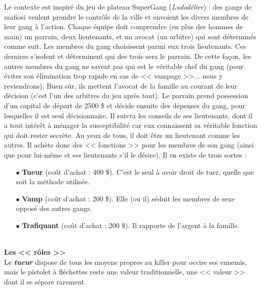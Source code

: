 \documentclass[11pt,twoside,a4paper]{article}
\begin{document}
\begin{multicols*}{2}
	\small
	
Le contexte est inspir{\'e} du jeu de plateau SuperGang (\emph{Ludod{\'e}lire}) : des gangs de mafiosi veulent prendre  le contr{\^o}le de la ville et envoient les divers membres  de leur gang {\`a} l'action. Chaque {\'e}quipe doit comprendre (en plus des hommes de main) un parrain, deux lieutenants, et un avocat (un arbitre) qui sont d{\'e}termin{\'e}s comme suit. Les membres du gang choisissent parmi eux trois lieutenants. Ces derniers s'isolent et d{\'e}terminent qui des trois sera le parrain. De cette fa\c{c}on, les autres membres du gang ne savent pas qui est le v{\'e}ritable chef du gang (pour {\'e}viter son {\'e}limination trop rapide en cas de << vampage >>... nous y reviendrons). Buen s{\^u}r, ils mettent l'avocat de la famille au courant de leur d{\'e}cision (c'est l'un des arbitres du jeu apr{\`e}s tout). Le parrain prend possession d'un capital de d{\'e}part de 2500 \$ et d{\'e}cide ensuite des d{\'e}penses du gang, pour lesquelles il est seul d{\'e}cisionnaire. Il suivra les conseils de ses lieutenants, dont il a tout int{\'e}r{\^e}t {\`a} m{\'e}nager la susceptibilit{\'e} car eux connaissent sa v{\'e}ritable fonction qui doit rester secr{\`e}te. Au yeux de tous, il doit {\^e}tre un lieutenant comme les autres. Il ach{\`e}te donc des << fonctions >> pour les membres de son gang (ainsi que pour lui-m{\^e}me et ses lieutenants s'il le d{\'e}sire). Il en existe de trois sortes : 
\begin{itemize}
	\item[$\bullet$] \textbf{Tueur} (co{\^u}t d'achat : 400 \$). C'est le seul {\`a} avoir droit de tuer, quelle que soit la m{\'e}thode utilis{\'e}e. 
	\item[$\bullet$] \textbf{Vamp} (co{\^u}t d'achat : 200 \$). Elle (ou il) s{\'e}duit les membres de sexe oppos{\'e} des autres gangs. 
	\item[$\bullet$] \textbf{Trafiquant} (co{\^u}t d'achat : 200 \$). Il rapporte de l'argent {\`a} la famille. 
\end{itemize}~\\

\textbf{\large Les << r{\^o}les >>}~\\

Le \textbf{\emph{tueur}} dispose de tous les moyens propres au killer pour occire ses ennemis, mais le pistolet {\`a} fl{\'e}chettes reste une valeur traditionnelle, une << valeur >> dont il se s{\'e}pare rarement. ~\\


\end{multicols*}
\end{document}
